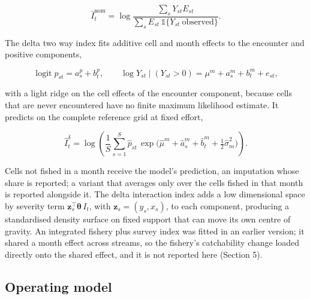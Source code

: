\documentclass[
  11pt,
  a4paper,
]{article}
\begin{document}
\begin{equation}
\widehat{I}^{\text{nom}}_t = \log \frac{\sum_s Y_{st} E_{st}}{\sum_s E_{st}\,\mathbb{1}\{Y_{st}\ \text{observed}\}} .
\end{equation}

\noindent The delta two way index fits additive cell and month effects to the
encounter and positive components,

\begin{equation}
\operatorname{logit} p_{st} = a^{p}_s + b^{p}_t, \qquad \log Y_{st} \mid (Y_{st} > 0) = \mu^{m} + a^{m}_s + b^{m}_t + e_{st},
\end{equation}

\noindent with a light ridge on the cell effects of the encounter component,
because cells that are never encountered have no finite maximum
likelihood estimate. It predicts on the complete reference grid at fixed
effort,

\begin{equation}
\widehat{I}^{\delta}_t = \log\!\left(\frac{1}{S}\sum_{s=1}^{S} \hat{p}_{st}\,\exp\!\big(\hat{\mu}^m + \hat{a}^m_s + \hat{b}^m_t + \tfrac{1}{2}\hat{\sigma}^2_m\big)\right).
\end{equation}

\noindent Cells not fished in a month receive the model's prediction, an
imputation whose share is reported; a variant that averages only over
the cells fished in that month is reported alongside it. The delta
interaction index adds a low dimensional space by severity term
\(\mathbf{z}_s^{\top}\boldsymbol{\theta}\,I_t\), with
\(\mathbf{z}_s = (y_s, x_s)\), to each component, producing a
standardised density surface on fixed support that can move its own
centre of gravity. An integrated fishery plus survey index was fitted in
an earlier version; it shared a month effect across streams, so the
fishery's catchability change loaded directly onto the shared effect,
and it is not reported here (Section 5).

\hypertarget{operating-model}{%
\subsection{Operating model}\label{operating-model}}
\end{document}
